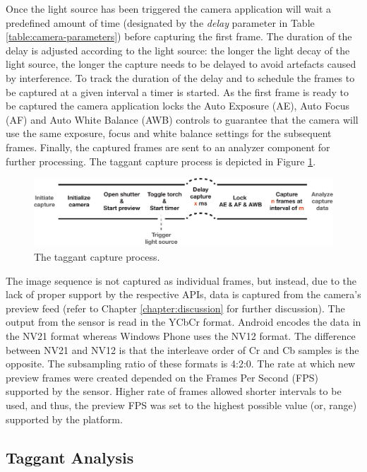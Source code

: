 \documentclass[thesis.tex]{subfiles}
\begin{document}
Once the light source has been triggered the camera application will wait a predefined amount of time (designated by the \emph{delay} parameter in Table \ref{table:camera-parameters}) before capturing the first frame. The duration of the delay is adjusted according to the light source: the longer the light decay of the light source, the longer the capture needs to be delayed to avoid artefacts caused by interference. To track the duration of the delay and to schedule the frames to be captured at a given interval a timer is started. As the first frame is ready to be captured the camera application locks the Auto Exposure (AE), Auto Focus (AF) and Auto White Balance (AWB) controls to guarantee that the camera will use the same exposure, focus and white balance settings for the subsequent frames. Finally, the captured frames are sent to an analyzer component for further processing. The taggant capture process is depicted in Figure \ref{figure:taggant-capture-process}.

\begin{figure}[h]
\centering \includegraphics[width=\textwidth,height=\textheight,keepaspectratio=true]{images/design_implementation/capture_process.pdf}
\caption{The taggant capture process. \label{figure:taggant-capture-process}}
\end{figure}

The image sequence is not captured as individual frames, but instead, due to the lack of proper support by the respective APIs, data is captured from the camera's preview feed (refer to Chapter \ref{chapter:discussion} for further discussion). The output from the sensor is read in the YCbCr format. Android encodes the data in the NV21 format whereas Windows Phone uses the NV12 format. The difference between NV21 and NV12 is that the interleave order of Cr and Cb samples is the opposite. The subsampling ratio of these formats is 4:2:0. The rate at which new preview frames were created depended on the Frames Per Second (FPS) supported by the sensor. Higher rate of frames allowed shorter intervals to be used, and thus, the preview FPS was set to the highest possible value (or, range) supported by the platform.

\subsection{Taggant Analysis}
\end{document}
